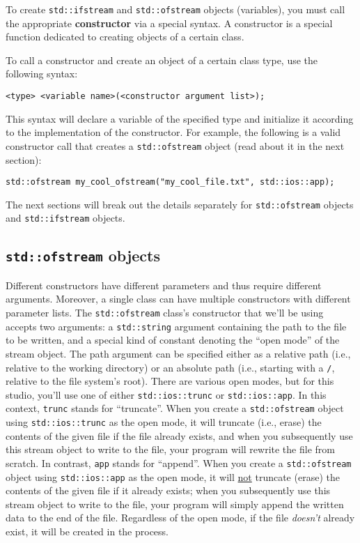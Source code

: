 \documentclass{article}
\begin{document}
To create \texttt{std::ifstream} and \texttt{std::ofstream} objects (variables), you must call the appropriate \textbf{constructor} via a special syntax. A constructor is a special function dedicated to creating objects of a certain class.

To call a constructor and create an object of a certain class type, use the following syntax:

\begin{verbatim}
<type> <variable name>(<constructor argument list>);
\end{verbatim}

This syntax will declare a variable of the specified type and initialize it according to the implementation of the constructor. For example, the following is a valid constructor call that creates a \texttt{std::ofstream} object (read about it in the next section):

\begin{verbatim}
std::ofstream my_cool_ofstream("my_cool_file.txt", std::ios::app);
\end{verbatim}

The next sections will break out the details separately for \texttt{std::ofstream} objects and \texttt{std::ifstream} objects.

\subsection{\texttt{std::ofstream} objects}

Different constructors have different parameters and thus require different arguments. Moreover, a single class can have multiple constructors with different parameter lists. The \texttt{std::ofstream} class's constructor that we'll be using accepts two arguments: a \texttt{std::string} argument containing the path to the file to be written, and a special kind of constant denoting the ``open mode'' of the stream object. The path argument can be specified either as a relative path (i.e., relative to the working directory) or an absolute path (i.e., starting with a \texttt{/}, relative to the file system's root). There are various open modes, but for this studio, you'll use one of either \texttt{std::ios::trunc} or \texttt{std::ios::app}. In this context, \texttt{trunc} stands for ``truncate''. When you create a \texttt{std::ofstream} object using \texttt{std::ios::trunc} as the open mode, it will truncate (i.e., erase) the contents of the given file if the file already exists, and when you subsequently use this stream object to write to the file, your program will rewrite the file from scratch. In contrast, \texttt{app} stands for ``append''. When you create a \texttt{std::ofstream} object using \texttt{std::ios::app} as the open mode, it will \ul{not} truncate (erase) the contents of the given file if it already exists; when you subsequently use this stream object to write to the file, your program will simply append the written data to the end of the file. Regardless of the open mode, if the file \textit{doesn't} already exist, it will be created in the process.
\end{document}
